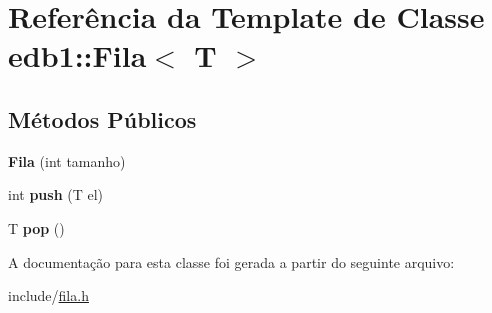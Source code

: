 \hypertarget{classedb1_1_1_fila}{}\section{Referência da Template de Classe edb1\+:\+:Fila$<$ T $>$}
\label{classedb1_1_1_fila}
\subsection*{Métodos Públicos}
\begin{DoxyCompactItemize}
\item 
\mbox{\label{classedb1_1_1_fila_aeab1ecc403db4487f7f309458b216095}} 
{\bfseries Fila} (int tamanho)
\item 
\mbox{\label{classedb1_1_1_fila_a56ebe670bad3fe1c40559cacfffea6ac}} 
int {\bfseries push} (T el)
\item 
\mbox{\label{classedb1_1_1_fila_a76a63836b817c1129d0b8ef9bf51af62}} 
T {\bfseries pop} ()
\end{DoxyCompactItemize}


A documentação para esta classe foi gerada a partir do seguinte arquivo\+:\begin{DoxyCompactItemize}
\item 
include/\hyperlink{fila_8h}{fila.\+h}\end{DoxyCompactItemize}
